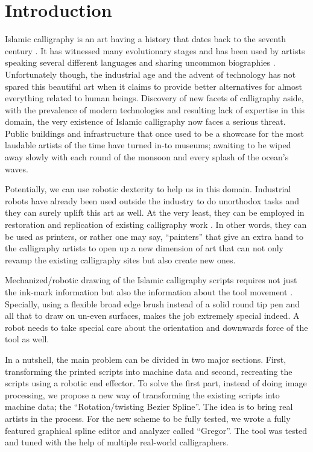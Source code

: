 \section{Introduction}
{
    Islamic calligraphy is an art having a history that dates back to the seventh century \cite{bib01, bib02}. It has witnessed many evolutionary stages \cite{bib02, bib03} and has been used by artists speaking several different languages \cite{bib04} and sharing uncommon biographies \cite{bib05,bib06,bib07,bib08}. Unfortunately though, the industrial age and the advent of technology has not spared this beautiful art when it claims to provide better alternatives for almost everything related to human beings. Discovery of new facets of calligraphy aside, with the prevalence of modern technologies and resulting lack of expertise in this domain, the very existence of Islamic calligraphy now faces a serious threat. Public buildings and infrastructure that once used to be a showcase for the most laudable artists of the time have turned in-to museums; awaiting to be wiped away slowly with each round of the monsoon and every splash of the ocean’s waves.

    Potentially, we can use robotic dexterity to help us in this domain. Industrial robots have already been used outside the industry to do unorthodox tasks \cite{bib09, bib10,bib11,bib12} and they can surely uplift this art as well. At the very least, they can be employed in restoration and replication of existing calligraphy work \cite{bib13}. In other words, they can be used as printers, or rather one may say, “painters” that give an extra hand to the calligraphy artists to open up a new dimension of art that can not only revamp the existing calligraphy sites but also create new ones.
     
     Mechanized/robotic drawing of the Islamic calligraphy scripts requires not just the ink-mark information but also the information about the tool movement \cite{bib03}. Specially, using a flexible broad edge brush instead of a solid round tip pen and all that to draw on un-even surfaces, makes the job extremely special indeed. A robot needs to take special care about the orientation and downwards force of the tool as well.

    In a nutshell, the main problem can be divided in two major sections. First, transforming the printed scripts into machine data and second, recreating the scripts using a robotic end effector.
    To solve the first part, instead of doing image processing, we propose a new way of transforming the existing scripts into machine data; the “Rotation/twisting Bezier Spline”. The idea is to bring real artists in the process. For the new scheme to be fully tested, we wrote a fully featured graphical spline editor and analyzer called “Gregor”. The tool was tested and tuned with the help of multiple real-world calligraphers.

}
